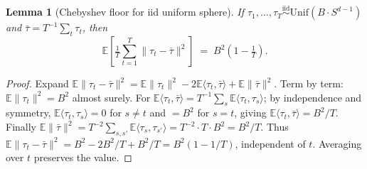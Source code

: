 \documentclass{article}
\newtheorem{lemma}[theorem]{Lemma}
\theoremstyle{remark}
\newcommand{\E}{\mathbb{E}}
\begin{document}
\bigskip

\begin{lemma}[Chebyshev floor for iid uniform sphere]\label{lem:floor}
If $\tau_1,\dots,\tau_T \stackrel{\mathrm{iid}}{\sim}
\mathrm{Unif}(B\cdot S^{d-1})$ and $\bar\tau = T^{-1}\sum_t \tau_t$,
then
\[
  \E\!\left[\tfrac{1}{T}\sum_{t=1}^T \|\tau_t - \bar\tau\|^2\right]
  \;=\; B^2\!\left(1 - \tfrac{1}{T}\right).
\]
\end{lemma}
\begin{proof}
Expand $\E\|\tau_t - \bar\tau\|^2 = \E\|\tau_t\|^2 - 2\E\langle\tau_t,
\bar\tau\rangle + \E\|\bar\tau\|^2$. Term by term: $\E\|\tau_t\|^2
= B^2$ almost surely. For $\E\langle\tau_t, \bar\tau\rangle = T^{-1}
\sum_s \E\langle\tau_t,\tau_s\rangle$; by independence and symmetry,
$\E\langle\tau_t,\tau_s\rangle = 0$ for $s\neq t$ and $= B^2$ for
$s=t$, giving $\E\langle\tau_t, \bar\tau\rangle = B^2/T$. Finally
$\E\|\bar\tau\|^2 = T^{-2}\sum_{s,s'} \E\langle\tau_s,\tau_{s'}
\rangle = T^{-2}\cdot T \cdot B^2 = B^2/T$. Thus $\E\|\tau_t - \bar
\tau\|^2 = B^2 - 2B^2/T + B^2/T = B^2(1 - 1/T)$, independent of $t$.
Averaging over $t$ preserves the value.
\end{proof}
\end{document}
